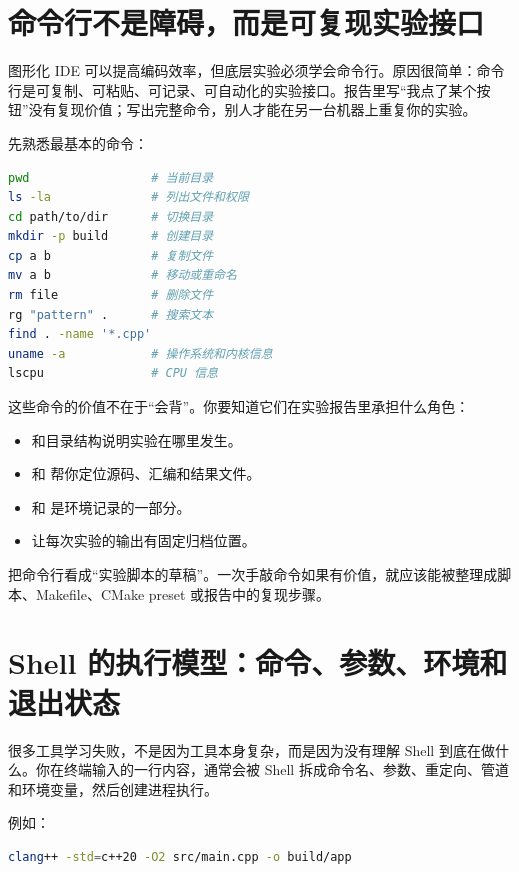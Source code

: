 \section{命令行不是障碍，而是可复现实验接口}

图形化 IDE 可以提高编码效率，但底层实验必须学会命令行。原因很简单：命令行是可复制、可粘贴、可记录、可自动化的实验接口。报告里写“我点了某个按钮”没有复现价值；写出完整命令，别人才能在另一台机器上重复你的实验。

先熟悉最基本的命令：

\begin{lstlisting}[language=bash]
pwd                 # 当前目录
ls -la              # 列出文件和权限
cd path/to/dir      # 切换目录
mkdir -p build      # 创建目录
cp a b              # 复制文件
mv a b              # 移动或重命名
rm file             # 删除文件
rg "pattern" .      # 搜索文本
find . -name '*.cpp'
uname -a            # 操作系统和内核信息
lscpu               # CPU 信息
\end{lstlisting}

这些命令的价值不在于“会背”。你要知道它们在实验报告里承担什么角色：

\begin{itemize}
  \item {} 和目录结构说明实验在哪里发生。
  \item {} 和  帮你定位源码、汇编和结果文件。
  \item {} 和  是环境记录的一部分。
  \item {} 让每次实验的输出有固定归档位置。
\end{itemize}

\begin{mentalmodel}
把命令行看成“实验脚本的草稿”。一次手敲命令如果有价值，就应该能被整理成脚本、Makefile、CMake preset 或报告中的复现步骤。
\end{mentalmodel}

\section{Shell 的执行模型：命令、参数、环境和退出状态}

很多工具学习失败，不是因为工具本身复杂，而是因为没有理解 Shell 到底在做什么。你在终端输入的一行内容，通常会被 Shell 拆成命令名、参数、重定向、管道和环境变量，然后创建进程执行。

例如：

\begin{lstlisting}[language=bash]
clang++ -std=c++20 -O2 src/main.cpp -o build/app
\end{lstlisting}

